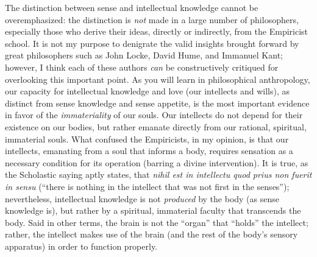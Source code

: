 \documentclass[article,12pt,a4paper,oneside]{memoir}
\begin{document}
    The distinction between sense and intellectual knowledge cannot be
    overemphasized: the distinction is \emph{not} made in a large number
    of philosophers, especially those who derive their ideas, directly
    or indirectly, from the Empiricist school. It is not my purpose to
    denigrate the valid insights brought forward by great philosophers
    such as John Locke, David Hume, and Immanuel Kant; however, I think
    each of these authors \emph{can} be constructively critiqued for
    overlooking this important point. As you will learn in philosophical
    anthropology, our capacity for intellectual knowledge and love (our
    intellects and wills), as distinct from sense knowledge and sense
    appetite, is the most important evidence in favor of the
    \emph{immateriality} of our souls. Our intellects do not depend for
    their existence on our bodies, but rather emanate directly from our
    rational, spiritual, immaterial souls. What confused the
    Empiricists, in my opinion, is that our intellects, emanating from a
    soul that informs a body, requires sensation as a necessary
    condition for its operation (barring a divine intervention). It is
    true, as the Scholastic saying aptly states, that \emph{nihil est in
    intellectu quod prius non fuerit in sensu} (``there is nothing in
    the intellect that was not first in the senses''); nevertheless,
    intellectual knowledge is not \emph{produced} by the body (as sense
    knowledge is), but rather by a spiritual, immaterial faculty that
    transcends the body. Said in other terms, the brain is not the
    ``organ'' that ``holds'' the intellect; rather, the intellect makes
    use of the brain (and the rest of the body's sensory apparatus) in
    order to function properly.
\end{document}
